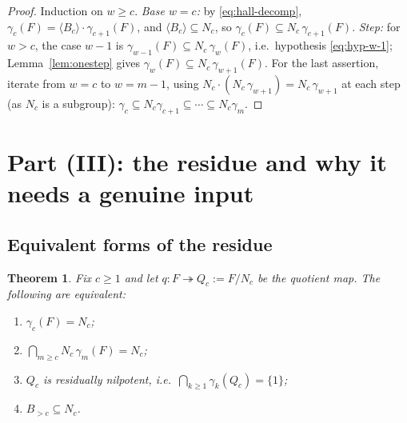 \documentclass{amsart}
\newtheorem{theorem}{Theorem}
\theoremstyle{definition}
\theoremstyle{remark}
\begin{document}
\begin{proof}
Induction on $w\ge c$. \emph{Base $w=c$:} by \eqref{eq:hall-decomp},
$\gamma_c(F)=\langle B_c\rangle\cdot\gamma_{c+1}(F)$, and $\langle B_c\rangle
\subseteq N_c$, so $\gamma_c(F)\subseteq N_c\,\gamma_{c+1}(F)$. \emph{Step:} for
$w>c$, the case $w-1$ is $\gamma_{w-1}(F)\subseteq N_c\,\gamma_{w}(F)$, i.e.\
hypothesis \eqref{eq:hyp-w-1}; Lemma~\ref{lem:onestep} gives $\gamma_w(F)\subseteq
N_c\,\gamma_{w+1}(F)$. For the last assertion, iterate from $w=c$ to $w=m-1$, using
$N_c\cdot(N_c\,\gamma_{w+1})=N_c\,\gamma_{w+1}$ at each step (as $N_c$ is a
subgroup): $\gamma_c\subseteq N_c\gamma_{c+1}\subseteq\cdots\subseteq N_c\gamma_m$.
\end{proof}

\section{Part (III): the residue and why it needs a genuine input}\label{sec:reduce}

\subsection{Equivalent forms of the residue}

\begin{theorem}\label{thm:equiv}
Fix $c\ge1$ and let $q\colon F\twoheadrightarrow Q_c:=F/N_c$ be the quotient map.
The following are equivalent:
\begin{enumerate}
\item[(a)] $\gamma_c(F)=N_c$;
\item[(b)] $\bigcap_{m\ge c} N_c\,\gamma_m(F)=N_c$;
\item[(c)] $Q_c$ is residually nilpotent, i.e.\ $\bigcap_{k\ge1}\gamma_k(Q_c)=\{1\}$;
\item[(d)] $B_{>c}\subseteq N_c$.
\end{enumerate}
\end{theorem}
\end{document}
